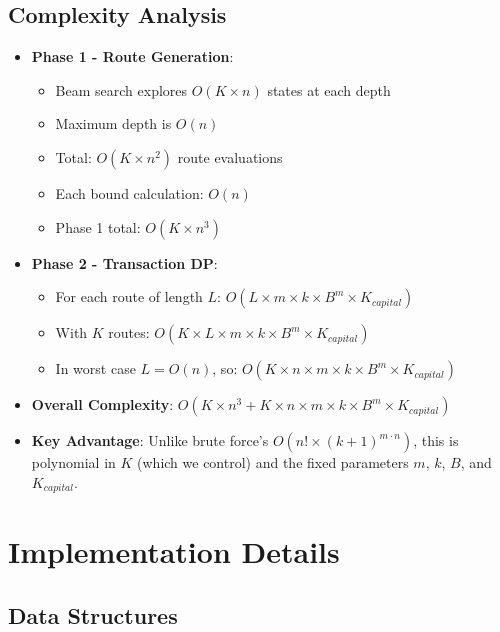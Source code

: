 \documentclass[12pt]{article}
\begin{document}
\subsection{Complexity Analysis}

\begin{itemize}
    \item \textbf{Phase 1 - Route Generation}: 
    \begin{itemize}
        \item Beam search explores $O(K \times n)$ states at each depth
        \item Maximum depth is $O(n)$
        \item Total: $O(K \times n^2)$ route evaluations
        \item Each bound calculation: $O(n)$
        \item Phase 1 total: $O(K \times n^3)$
    \end{itemize}
    
    \item \textbf{Phase 2 - Transaction DP}:
    \begin{itemize}
        \item For each route of length $L$: $O(L \times m \times k \times B^m \times K_{capital})$
        \item With $K$ routes: $O(K \times L \times m \times k \times B^m \times K_{capital})$
        \item In worst case $L = O(n)$, so: $O(K \times n \times m \times k \times B^m \times K_{capital})$
    \end{itemize}
    
    \item \textbf{Overall Complexity}: $O(K \times n^3 + K \times n \times m \times k \times B^m \times K_{capital})$
    
    \item \textbf{Key Advantage}: Unlike brute force's $O(n! \times (k+1)^{m \cdot n})$, this is polynomial in $K$ (which we control) and the fixed parameters $m$, $k$, $B$, and $K_{capital}$.
\end{itemize}

\section{Implementation Details}
\label{sec:implementation}

\subsection{Data Structures}
\end{document}
